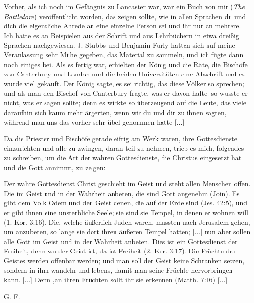 Vorher, als ich noch im Gefängnis zu Lancaster war, war
ein Buch von mir (\textit{The Battledore}) veröffentlicht 
worden, das zeigen sollte, wie in allen Sprachen \glqq du\grqq{} 
und \glqq dich\grqq{} die eigentliche Anrede an eine einzelne 
Person sei und \glqq ihr\grqq{} nur an mehrere.
Ich hatte es an Beispielen aus der Schrift und aus Lehrbüchern
in etwa dreißig Sprachen nachgewiesen. J. Stubbs und Benjamin
Furly hatten sich auf meine Veranlassung sehr Mühe gegeben,
das Material zu sammeln, und ich fügte dann noch einiges bei.
Als es fertig war, erhielten der König und die Räte, die Bischöfe
von Canterbury und London und die beiden Universitäten eine
Abschrift und es wurde viel gekauft. Der König sagte, es sei
richtig, das diese Völker so sprechen; und als man den Bischof
von Canterbury fragte, was er davon halte, so wusste er nicht,
was er sagen sollte; denn es wirkte so überzeugend auf die Leute,
das viele daraufhin sich kaum mehr ärgerten, wenn wir \glqq du\grqq{}
und \glqq dir\grqq{} zu ihnen sagten, während man uns das vorher sehr
übel genommen hatte [...]

Da die Priester und Bischöfe gerade eifrig am Werk waren,
ihre Gottesdienste einzurichten und alle zu zwingen, daran teil
zu nehmen, trieb es mich, folgendes zu schreiben, um die Art der
wahren Gottesdienste, die Christus eingesetzt hat und die Gott
annimmt, zu zeigen:

\glqq Der wahre Gottesdienst Christ geschieht im Geist und steht
allen Menschen offen. Die im Geist und in der Wahrheit anbeten, 
die sind Gott angenehm (Join). Es gibt dem Volk Odem
und den Geist denen, die auf der Erde sind (Jes. 42:5), und er
gibt ihnen eine unsterbliche Seele; sie sind sie Tempel, in denen
er wohnen will (1. Kor. 3:16). Die, welche äußerlich
Juden waren, mussten nach Jerusalem gehen, um anzubeten, so
lange sie dort ihren äußeren Tempel hatten; [...] nun aber
sollen alle \glqq Gott im Geist und in der Wahrheit anbeten\grqq{}. Dies
ist ein Gottesdienst der Freiheit, denn \glqq wo der Geist ist, da ist
Freiheit\grqq{} (2. Kor. 3:17). Die Früchte des Geistes werden
offenbar werden; und man soll der Geist keine Schranken setzen,
sondern in ihm wandeln und lebens, damit man seine Früchte
hervorbringen kann. [...] Denn ,an ihren Früchten sollt ihr
sie erkennen\grqq{} (Matth. 7:16) [...] 
 \begin{flushright}G. F. \end{flushright}

